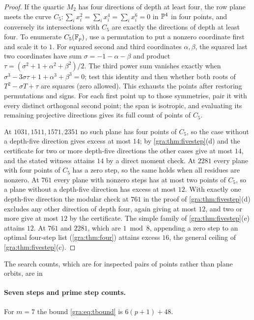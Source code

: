 \begin{proof}
If the quartic $M_2$ has four directions of depth at least four, the row
plane meets the curve
$C_5:\sum_ix_i^2=\sum_ix_i^4=\sum_ix_i^6=0$ in $\mathbb{P}^4$ in four points,
and conversely its intersections with $C_5$ are exactly the directions of
depth at least four. To enumerate $C_5(\mathbb{F}_p)$, use a permutation to put a
nonzero coordinate first and scale it to $1$. For squared second and third
coordinates $\alpha,\beta$, the squared last two coordinates have sum
$\sigma=-1-\alpha-\beta$ and product
$\tau=(\sigma^2+1+\alpha^2+\beta^2)/2$. The third power sum vanishes
exactly when $\sigma^3-3\sigma\tau+1+\alpha^3+\beta^3=0$; test this
identity and then whether both roots of $T^2-\sigma T+\tau$ are squares
(zero allowed). This exhausts the points after restoring permutations and
signs. For each first point up to those symmetries, pair it with every
distinct orthogonal second point; the span is isotropic, and evaluating
its remaining projective directions gives its full count of points of
$C_5$.

At $1031,1511,1571,2351$ no such plane has four points of $C_5$, so the
case without a depth-five direction gives excess at most $14$; by
\cref{gra:thm:fivestep}(d) and the certificate for two or more depth-five
directions the other cases give at most $14$, and the stated witness
attains $14$ by a direct moment check. At $2281$ every plane with four
points of $C_5$ has a zero step, so the same holds when all residues are
nonzero. At $761$ every plane with nonzero steps has at most two points of
$C_5$, so a plane without a depth-five direction has excess at most $12$.
With exactly one depth-five direction the modular check at $761$ in the
proof of \cref{gra:thm:fivestep}(d) excludes any other direction of depth
four, again giving at most $12$, and two or more give at most $12$ by the
certificate. The simple family of \cref{gra:thm:fivestep}(e) attains $12$.
At $761$ and $2281$, which are $1\bmod8$, appending a zero step to an
optimal four-step list (\cref{gra:thm:four}) attains excess $16$, the
general ceiling of \cref{gra:thm:fivestep}(c).
\end{proof}

The search counts, which are for inspected pairs of points rather than
plane orbits, are in

\paragraph{Seven steps and prime step counts.}
For $m=7$ the bound \eqref{gra:eq:tbound} is $6(p+1)+48$.

